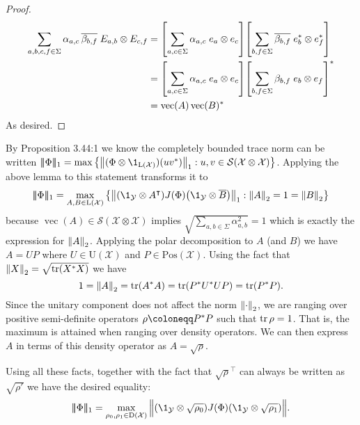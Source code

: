 \documentclass[boxes,pages,color=SeaGreen]{homework}
\renewcommand{\vec}{\operatorname{vec}}
\newcommand{\X}{\mathcal{X}}
\newcommand{\Y}{\mathcal{Y}}
\newcommand{\Lin}{\mathrm{L}}
\newcommand{\Pos}{\mathrm{Pos}}
\newcommand{\Unitary}{\mathrm{U}}
\newcommand{\Density}{\mathrm{D}}
\newcommand{\triplenorm}[1]{
  \lvert\!\lvert\!\lvert #1
  \rvert\!\rvert\!\rvert}
\begin{document}
\begin{solution}
\begin{proof}
        \begin{align*}
            \sum_{a,b,c,f\in\Sigma}\alpha_{a,c}\,\overline{\beta_{b,f}}\;E_{a,b}\otimes E_{c,f} & = \qty[\sum_{a,c\in\Sigma}\alpha_{a,c}\;e_a\otimes e_c]\qty[\sum_{b,f\in\Sigma}\overline{\beta_{b,f}}\;e_b^*\otimes e_f^*] \\
                                                                                                & = \qty[\sum_{a,c\in\Sigma}\alpha_{a,c}\;e_a\otimes e_c]\qty[\sum_{b,f\in\Sigma}\beta_{b,f}\;e_b\otimes e_f]^*              \\
                                                                                                & = \vec(A)\vec(B)^*
        \end{align*}
        As desired.
    \end{proof}
    By Proposition 3.44:1 we know the completely bounded trace norm can be written $\triplenorm{\Phi}_1 = \max\qty{\norm{(\Phi\otimes\1_{\Lin(\X)})(uv^*)}_1: u,v\in\mathcal{S}(\X\otimes\X)}$.
    Applying the above lemma to this statement transforms it to
    \begin{equation*}
        \triplenorm{\Phi}_1 = \max_{A,B\in\Lin(\X)}\qty{\norm{\qty(\1_\Y\otimes A^\intercal)J(\Phi)\qty(\1_\Y\otimes\overline{B})}_1 : \norm{A}_2 = 1 = \norm{B}_2}
    \end{equation*}
    because $\vec(A)\in\mathcal{S}(\X\otimes\X)$ implies $\sqrt{\sum_{a,b\in\Sigma}\alpha_{a,b}^2} = 1$ which is exactly the expression for $\norm{A}_2$.
    Applying the polar decomposition to $A$ (and $B$) we have $A = UP$ where $U\in\Unitary(\X)$ and $P\in\Pos(\X)$.
    Using the fact that $\norm{X}_2 = \sqrt{\tr(X^*X)}$ we have
    \begin{equation*}
        1 = \norm{A}_2 = \tr(A^*A) = \tr(P^*U^*UP) = \tr(P^*P).
    \end{equation*}
    Since the unitary component does not affect the norm $\norm{\cdot}_2$, we are ranging over positive semi-definite operators $\rho \defeq P^*P$ such that $\tr \rho = 1$.
    That is, the maximum is attained when ranging over density operators.
    We can then express $A$ in terms of this density operator as $A = \sqrt{\rho}$.

    Using all these facts, together with the fact that $\sqrt{\rho}^\intercal$ can always be written as $\sqrt{\rho'}$ we have the desired equality:
    \begin{equation*}
        \triplenorm{\Phi}_1 = \max_{\rho_0,\rho_1\in\Density(\X)} \norm\Big{\qty(\1_\Y\otimes\sqrt{\rho_0})J(\Phi)\qty(\1_\Y\otimes\sqrt{\rho_1})}.
    \end{equation*}
\end{solution}
\end{document}
